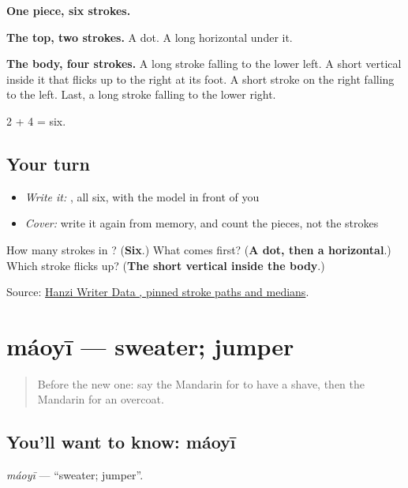 \begin{quote}
\end{quote}

\textbf{One piece, six strokes.}

\textbf{The top, two strokes.} A dot. A long horizontal under it.

\textbf{The body, four strokes.} A long stroke falling to the lower left. A short vertical inside it that flicks up to the right at its foot. A short stroke on the right falling to the left. Last, a long stroke falling to the lower right.

2 + 4 = six.

\subsection*{Your turn}
\begin{itemize}
\raggedright
  \item \emph{Write it:} , all six, with the model in front of you
  \item \emph{Cover:} write it again from memory, and count the pieces, not the strokes
\end{itemize}

\begin{tcolorbox}[breakable,colback=teal!4,colframe=teal!35!black,title={Before you move on}]
How many strokes in ? (\textbf{Six}.) What comes first? (\textbf{A dot, then a horizontal}.) Which stroke flicks up? (\textbf{The short vertical inside the body}.)

Source: \href{https://raw.githubusercontent.com/chanind/hanzi-writer-data/68d10a4b21150cae5e1ebbd223eed289cf32d90c/data/\%E8\%A1\%A3.json}{Hanzi Writer Data , pinned stroke paths and medians}.
\end{tcolorbox}
\section[máoyī]{máoyī — sweater; jumper}

\label{lesson:ZH-C165-maoyi}



\begin{quote}
Before the new one: say the Mandarin for to have a shave, then the Mandarin for an overcoat.
\end{quote}

\subsection*{You'll want to know: máoyī}
\emph{máoyī} — \textquotedblleft{}sweater; jumper\textquotedblright{}.

